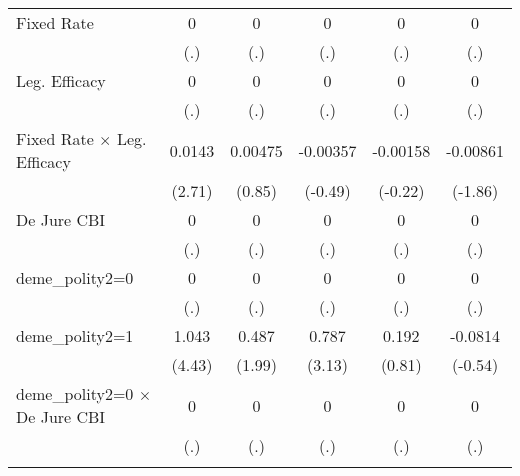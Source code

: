 \begin{table}[htbp]
\begin{tabular}{l*{5}{c}}
\addlinespace
Fixed Rate                              &        0         &        0         &        0         &        0         &        0         \\
                                        &      (.)         &      (.)         &      (.)         &      (.)         &      (.)         \\
\addlinespace
Leg. Efficacy                           &        0         &        0         &        0         &        0         &        0         \\
                                        &      (.)         &      (.)         &      (.)         &      (.)         &      (.)         \\
\addlinespace
Fixed Rate $\times$ Leg. Efficacy       &   0.0143\sym{**} &  0.00475         & -0.00357         & -0.00158         & -0.00861         \\
                                        &   (2.71)         &   (0.85)         &  (-0.49)         &  (-0.22)         &  (-1.86)         \\
\addlinespace
De Jure CBI                             &        0         &        0         &        0         &        0         &        0         \\
                                        &      (.)         &      (.)         &      (.)         &      (.)         &      (.)         \\
\addlinespace
deme\_polity2=0                          &        0         &        0         &        0         &        0         &        0         \\
                                        &      (.)         &      (.)         &      (.)         &      (.)         &      (.)         \\
\addlinespace
deme\_polity2=1                          &    1.043\sym{***}&    0.487\sym{*}  &    0.787\sym{**} &    0.192         &  -0.0814         \\
                                        &   (4.43)         &   (1.99)         &   (3.13)         &   (0.81)         &  (-0.54)         \\
\addlinespace
deme\_polity2=0 $\times$ De Jure CBI     &        0         &        0         &        0         &        0         &        0         \\
                                        &      (.)         &      (.)         &      (.)         &      (.)         &      (.)         \\
\addlinespace

\end{tabular}
\end{table}
